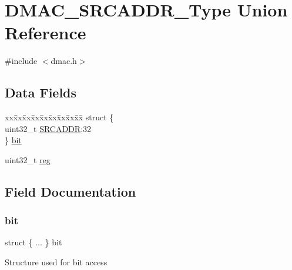 \hypertarget{union_d_m_a_c___s_r_c_a_d_d_r___type}{}\section{D\+M\+A\+C\+\_\+\+S\+R\+C\+A\+D\+D\+R\+\_\+\+Type Union Reference}
\label{union_d_m_a_c___s_r_c_a_d_d_r___type}


{\ttfamily \#include $<$dmac.\+h$>$}

\subsection*{Data Fields}
\begin{DoxyCompactItemize}
\item 
\begin{tabbing}
xx\=xx\=xx\=xx\=xx\=xx\=xx\=xx\=xx\=\kill
struct \{\\
\>uint32\_t \mbox{\hyperlink{union_d_m_a_c___s_r_c_a_d_d_r___type_ac1acf36eba231287ff62ee68a8ccf833}{SRCADDR}}:32\\
\} \mbox{\hyperlink{union_d_m_a_c___s_r_c_a_d_d_r___type_aba1a7606af42fb4998addedf901c0a2f}{bit}}\\

\end{tabbing}\item 
uint32\+\_\+t \mbox{\hyperlink{union_d_m_a_c___s_r_c_a_d_d_r___type_a6b91636401516a477989a336376d7b40}{reg}}
\end{DoxyCompactItemize}


\subsection{Field Documentation}
\mbox{\label{union_d_m_a_c___s_r_c_a_d_d_r___type_aba1a7606af42fb4998addedf901c0a2f}} 
\subsubsection{\texorpdfstring{bit}{bit}}
{\footnotesize\ttfamily struct \{ ... \}   bit}

Structure used for bit access \mbox{\label{union_d_m_a_c___s_r_c_a_d_d_r___type_a6b91636401516a477989a336376d7b40}} 
